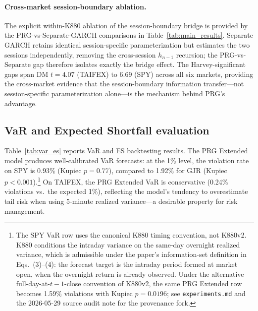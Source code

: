 \documentclass[11pt,a4paper]{article}
\begin{document}
\paragraph{Cross-market session-boundary ablation.} The explicit within-K880 ablation of the session-boundary bridge is provided by the PRG-vs-Separate-GARCH comparisons in Table~\ref{tab:main_results}. Separate GARCH retains identical session-specific parameterization but estimates the two sessions independently, removing the cross-session $h_{n-1}$ recursion; the PRG-vs-Separate gap therefore isolates exactly the bridge effect. The Harvey-significant gaps span DM $t = 4.07$ (TAIFEX) to 6.69 (SPY) across all six markets, providing the cross-market evidence that the session-boundary information transfer---not session-specific parameterization alone---is the mechanism behind PRG's advantage.

\subsection{VaR and Expected Shortfall evaluation}

Table~\ref{tab:var_es} reports VaR and ES backtesting results. The PRG Extended model produces well-calibrated VaR forecasts: at the 1\% level, the violation rate on SPY is 0.93\% (Kupiec $p = 0.77$), compared to 1.92\% for GJR (Kupiec $p < 0.001$).\footnote{The SPY VaR row uses the canonical K880 timing convention, not K880v2. K880 conditions the intraday variance on the same-day overnight realized variance, which is admissible under the paper's information-set definition in Eqs.~(3)--(4): the forecast target is the intraday period formed at market open, when the overnight return is already observed. Under the alternative full-day-at-$t\!-\!1$-close convention of K880v2, the same PRG Extended row becomes 1.59\% violations with Kupiec $p = 0.0196$; see \texttt{experiments.md} and the 2026-05-29 source audit note for the provenance fork.} On TAIFEX, the PRG Extended VaR is conservative (0.24\% violations vs.\ the expected 1\%), reflecting the model's tendency to overestimate tail risk when using 5-minute realized variance---a desirable property for risk management.
\end{document}
